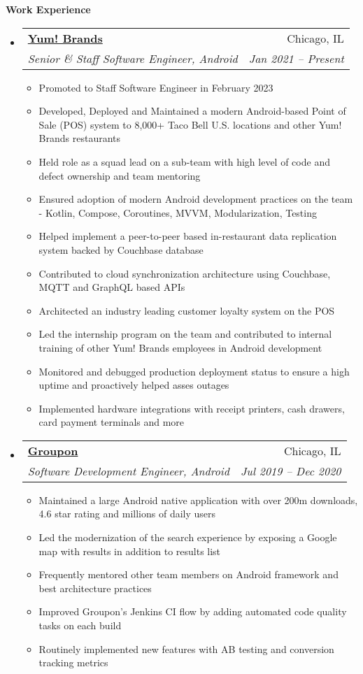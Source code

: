 \documentclass[letterpaper,11pt]{article}
\makeatletter
\newcommand{\resitem}[1]{\item #1 \vspace{-2pt}}
\newcommand{\resheading}[1]{{\large \colorbox{mygrey}{\begin{minipage}{\textwidth}{\textbf{#1 \vphantom{p\^{E}}}}\end{minipage}}}}
\newcommand{\ressubheading}[4]{
\begin{tabular*}{6.5in}{l@{\extracolsep{\fill}}r}
		\textbf{#1} & #2 \\
		\textit{#3} & \textit{#4} \\
\end{tabular*}\vspace{-6pt}}
\makeatother
\begin{document}
\resheading{Work Experience}
	\begin{itemize}
		\item 
		\ressubheading{\href{http://www.yum.dev}{Yum! Brands}}{Chicago, IL}{Senior \& Staff Software Engineer, Android}{Jan 2021 -- Present}
		{ \footnotesize
			\begin{itemize}
                \resitem{Promoted to Staff Software Engineer in February 2023}
                \resitem{Developed, Deployed and Maintained a modern Android-based Point of Sale (POS) system to 8,000+ Taco Bell U.S. locations and other Yum! Brands restaurants}
                \resitem{Held role as a squad lead on a sub-team with high level of code and defect ownership and team mentoring}
                \resitem{Ensured adoption of modern Android development practices on the team - Kotlin, Compose, Coroutines, MVVM, Modularization, Testing}
                \resitem{Helped implement a peer-to-peer based in-restaurant data replication system backed by Couchbase database}
                \resitem{Contributed to cloud synchronization architecture using Couchbase, MQTT and GraphQL based APIs}
                \resitem{Architected an industry leading customer loyalty system on the POS}
                \resitem{Led the internship program on the team and contributed to internal training of other Yum! Brands employees in Android development}
                \resitem{Monitored and debugged production deployment status to ensure a high uptime and proactively helped asses outages}
                \resitem{Implemented hardware integrations with receipt printers, cash drawers, card payment terminals and more}
			\end{itemize}
		}
		\item 
		\ressubheading{\href{http://www.groupon.com}{Groupon}}{Chicago, IL}{Software Development Engineer, Android}{Jul 2019 -- Dec 2020}
		{ \footnotesize
			\begin{itemize}
				\resitem{Maintained a large Android native application with over 200m downloads, 4.6 star rating and millions of daily users}
				\resitem{Led the modernization of the search experience by exposing a Google map with results in addition to results list}
				\resitem{Frequently mentored other team members on Android framework and best architecture practices}
				     \resitem{Improved Groupon's Jenkins CI flow by adding automated code quality tasks on each build}
				\resitem{Routinely implemented new features with AB testing and conversion tracking metrics}

\end{itemize}}
\end{itemize}
\end{document}
